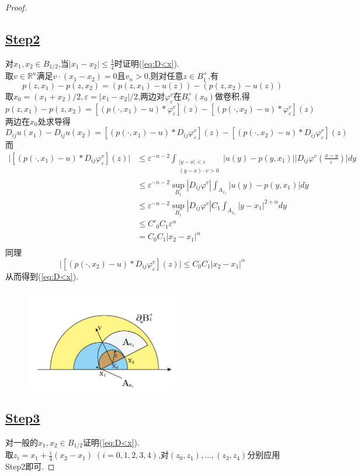 \documentclass[12pt,A4paper,reqno]{amsart}
\numberwithin{equation}{section}
\theoremstyle{plain}
\theoremstyle{plain}
\theoremstyle{plain}
\numberwithin{equation}{section}
\theoremstyle{remark}
\begin{document}
\begin{proof}
	\subsection*{\underline{Step2}}
	对$x_1,x_2 \in B_{1/2}$,当$|x_1-x_2| \leqslant \frac{1}{4}$时证明(\ref{eq:D<x}).\\
	 取$v \in \mathbb{R}^n$满足$v \cdot (x_{1}-x_{2})=0$且$v_n>0$,则对任意$z \in B_1^{+}$,有
	$$p(z,x_1)-p(z,x_2)=(p(z,x_1)-u(z))-(p(z,x_2)-u(z))$$
	取$x_0=\left(x_{1}+x_{2}\right) / 2, \varepsilon=\left|x_{1}-x_{2}\right| / 2$,两边对$\varphi_{\varepsilon}^{v}$在$B_{\varepsilon}^{+}(x_0)$做卷积,得
	$$p(z,x_1)-p(z,x_2)=[(p(\cdot,x_1)-u) *\varphi_{\varepsilon}^{v}](z) -[(p(\cdot,x_2)-u) *\varphi_{\varepsilon}^{v}](z)$$	
	两边在$x_0$处求导得
	$$D_{i j} u\left(x_{1}\right)-D_{i j} u\left(x_{2}\right)=[(p(\cdot,x_1)-u) *D_{i j}\varphi_{\varepsilon}^{v}](z) -[(p(\cdot,x_2)-u) *D_{i j}\varphi_{\varepsilon}^{v}](z)$$
	而
	\begin{equation*}
	\begin{aligned}
		\biggl|[(p(\cdot,x_1)-u) *D_{i j}\varphi_{\varepsilon}^{v}](z)\biggr|&\leqslant\varepsilon^{-n-2} \int_{\substack{|y-x|<\varepsilon \\ (y-x)\cdot v>0}}\left|u(y)-p\left(y, x_1\right)\right|\biggl| D_{i j} \varphi^{v}(\frac{x-y}{\varepsilon})\biggr| d y\\
		&\leqslant \varepsilon^{-n-2}\sup_{B_{1}}|D_{i j} \varphi^{v}| \int_{A_{x_1}}\left|u(y)-p\left(y, x_1\right)\right| d y\\
		&\leqslant \varepsilon^{-n-2}\sup_{B_{1}}|D_{i j} \varphi^{v}|C_1 \int_{A_{x_1}}\left|y-x_1\right|^{2+\alpha} d y\\
		&\leqslant C'_0C_1 \varepsilon^{\alpha}\\
		&= C_0C_1 |x_2-x_1|^{\alpha}\\
	\end{aligned}
	\end{equation*}
	同理
	$$\biggl|[(p(\cdot,x_2)-u) *D_{i j}\varphi_{\varepsilon}^{v}](z)\biggr|\leqslant C_0C_1 |x_2-x_1|^{\alpha}$$
	从而得到(\ref{eq:D<x}).
	\begin{figure}[th]
		\centering
		\includegraphics[width=0.6\textwidth]{figures/figure3-01.png}\\
		\caption{}
	\end{figure}
	\subsection*{\underline{Step3}}
	对一般的$x_1,x_2 \in B_{1/2}$证明(\ref{eq:D<x}).\\
	取$z_i=x_1+\frac{i}{4}(x_2-x_1)\; (i=0,1,2,3,4)$,对$(z_0,z_1),\ldots,(z_3,z_4)$分别应用Step2即可.
\end{proof}
\end{document}

